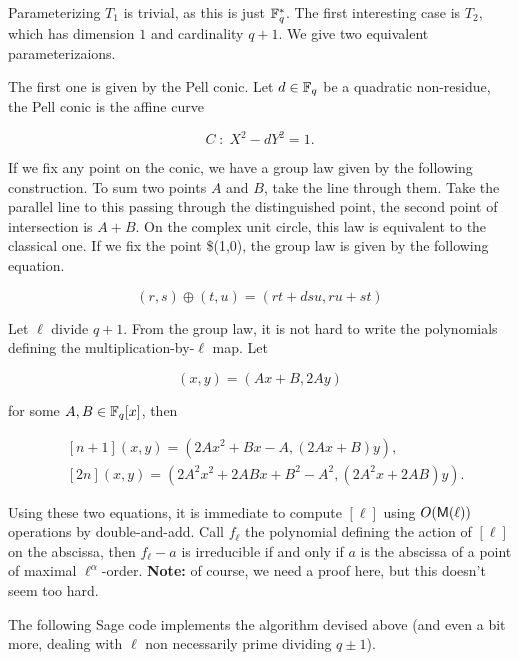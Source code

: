 \documentclass[11pt]{article}
\begin{document}
Parameterizing $T_1$ is trivial, as this is just $\mathbb{F}_q^\ast$. The
first interesting case is $T_2$, which has dimension $1$ and
cardinality $q+1$. We give two equivalent parameterizaions.
    
The first one is given by the Pell conic. Let $d\in\mathbb{F}_q$ be a
quadratic non-residue, the Pell conic is the affine curve
    
\begin{equation}
  C\;:\;X^2 - dY^2 = 1.
\end{equation}
    
If we fix any point on the conic, we have a group law given by the
following construction. To sum two points $A$ and $B$, take the line
through them. Take the parallel line to this passing through the
distinguished point, the second point of intersection is $A+B$. On the
complex unit circle, this law is equivalent to the classical one. If
we fix the point \$(1,0), the group law is given by the following
equation.
    
\begin{equation}
  (r,s) \oplus (t,u) = (rt+dsu, ru+st)
\end{equation}
    
Let $\ell$ divide $q+1$. From the group law, it is not hard to write
the polynomials defining the multiplication-by-$\ell$ map. Let
    
\begin{equation}
  [n](x,y) = (Ax + B, 2Ay)
\end{equation}
   
for some $A,B\in\mathbb{F}_q[x]$, then
   
\begin{align}
  &[n+1](x,y) = (2Ax^2 + Bx -A, (2Ax + B)y),\\
  &[2n](x,y) = (2A^2x^2 + 2ABx + B^2 - A^2, (2A^2x + 2AB)y).
\end{align}
   
Using these two equations, it is immediate to compute $[\ell]$ using
$O(\mathsf{M}(\ell))$ operations by double-and-add. Call $f_\ell$ the
polynomial defining the action of $[\ell]$ on the abscissa, then
$f_\ell - a$ is irreducible if and only if $a$ is the abscissa of a
point of maximal $\ell^\alpha$-order. \textbf{Note:} of course, we
need a proof here, but this doesn't seem too hard.

The following Sage code implements the algorithm devised above (and
even a bit more, dealing with $\ell$ non necessarily prime dividing
$q\pm 1$).
\end{document}
